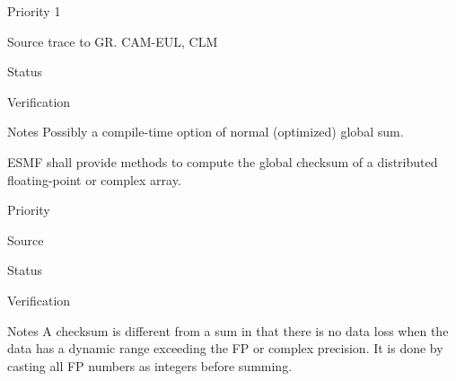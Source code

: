 \begin{reqlist}
\item[Priority] 1
\item[Source] trace to GR. CAM-EUL, CLM
\item[Status]
\item[Verification]
\item[Notes] Possibly a compile-time option of normal (optimized)
             global sum.
\end{reqlist}


ESMF shall provide methods to compute the global checksum of a
distributed floating-point or complex array. 

\begin{reqlist}
\item[Priority]
\item[Source]
\item[Status]
\item[Verification]
\item[Notes] A checksum is different from a sum in that there is no
  data loss when the data has a dynamic range exceeding the FP or
  complex precision. It is done by casting all FP numbers as integers
  before summing.
\end{reqlist}

%
%






